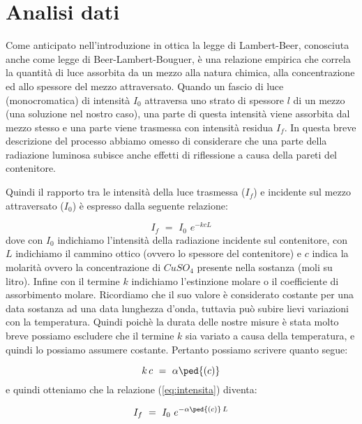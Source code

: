 \section{Analisi dati}

Come anticipato nell'introduzione in ottica la legge di Lambert-Beer, conosciuta anche come legge di Beer-Lambert-Bouguer, è una relazione empirica che correla la quantità di luce assorbita da un mezzo alla natura chimica, alla concentrazione ed allo spessore del mezzo attraversato.
Quando un fascio di luce (monocromatica) di intensità $I_0$ attraversa uno strato di spessore $l$ di un mezzo (una soluzione nel nostro caso), una parte di questa intensità viene assorbita dal mezzo stesso e una parte viene trasmessa con intensità residua $I_f$.
In questa breve descrizione del processo abbiamo omesso di considerare che una parte della radiazione luminosa subisce anche effetti di riflessione a causa della pareti del contenitore.

Quindi il rapporto tra le intensità della luce trasmessa ($I_f$) e incidente sul mezzo attraversato ($I_0$) è espresso dalla seguente relazione:

\begin{equation}
	I_f \,\,=\,\, I_0 \,\, e^{-kcL}
	\label{eq:intensita}
\end{equation}
%
dove con $I_0$ indichiamo l'intensità della radiazione incidente sul contenitore, con $L$ indichiamo il cammino ottico (ovvero lo spessore del contenitore) e $c$ indica la molarità ovvero la concentrazione di $CuSO_4$ presente nella sostanza (moli su litro). Infine con il termine $k$ indichiamo l'estinzione molare o il coefficiente di assorbimento molare. Ricordiamo che il suo valore è considerato costante per una data sostanza ad una data lunghezza d'onda, tuttavia può subire lievi variazioni con la temperatura.
Quindi poichè la durata delle nostre misure è stata molto breve possiamo escludere che il termine $k$ sia variato a causa della temperatura, e quindi lo possiamo assumere costante.
Pertanto possiamo scrivere quanto segue:

\begin{equation}
	k\,c \,\,=\,\, \alpha\ped{(c)}
\end{equation}
%
e quindi otteniamo che la relazione (\ref{eq:intensita}) diventa:

\begin{equation}
	I_f \,\,=\,\, I_0 \,\, e^{-\alpha\ped{(c)}\,L}
	\label{eq:inutile}
\end{equation}
%

